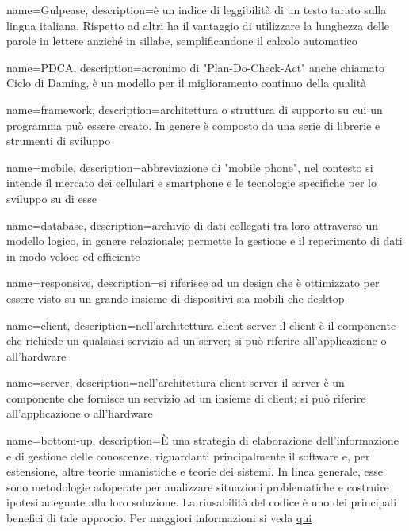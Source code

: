  {
	name=Gulpease,
	description={è un indice di leggibilità di un testo tarato sulla lingua italiana. Rispetto ad altri ha il vantaggio di utilizzare la lunghezza delle parole in lettere anziché in sillabe, semplificandone il calcolo automatico}
}

 {
	name=PDCA,
	description={acronimo di "Plan-Do-Check-Act" anche chiamato Ciclo di Daming, è un modello per il miglioramento continuo della qualità}
}

 {
	name=framework,
	description={architettura o struttura di supporto su cui un programma può essere creato. In genere è composto da una serie di librerie e strumenti di sviluppo}
}

 {
	name=mobile,
	description={abbreviazione di "mobile phone", nel contesto si intende il mercato dei cellulari e smartphone e le tecnologie specifiche per lo sviluppo su di esse}
}

 {
	name=database,
	description={archivio di dati collegati tra loro attraverso un modello logico, in genere relazionale; permette la gestione e il reperimento di dati in modo veloce ed efficiente}
}

 {
	name=responsive,
	description={si riferisce ad un design che è ottimizzato per essere visto su un grande insieme di dispositivi sia mobili che desktop}
}

 {
	name=client,
	description={nell'architettura client-server il client è il componente che richiede un qualsiasi servizio ad un server; si può riferire all'applicazione o all'hardware}
}

 {
	name=server,
	description={nell'architettura client-server il server è un componente che fornisce un servizio ad un insieme di client; si può riferire all'applicazione o all'hardware}
}

 {
	name=bottom-up,
	description={È una strategia di elaborazione dell'informazione e di gestione delle conoscenze, riguardanti principalmente il software e, per estensione, altre teorie umanistiche e teorie dei sistemi. In linea generale, esse sono metodologie adoperate per analizzare situazioni problematiche e costruire ipotesi adeguate alla loro soluzione. La riusabilità del codice è uno dei principali benefici di tale approcio. Per maggiori informazioni si veda \href{https://it.wikipedia.org/wiki/Progettazione_top-down_e_bottom-up}{qui}}
}

